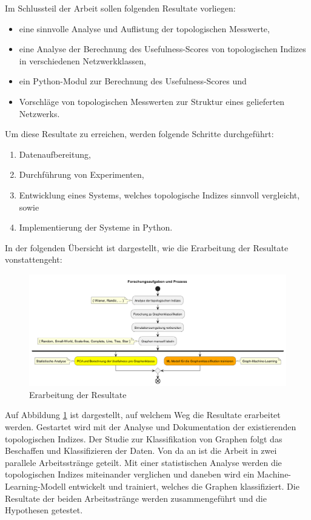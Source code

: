 Im Schlussteil der Arbeit sollen folgenden Resultate vorliegen:
\begin{itemize}
    \item eine sinnvolle Analyse und Auflistung der topologischen Messwerte,
    \item eine Analyse der Berechnung des Usefulness-Scores von topologischen Indizes in verschiedenen Netzwerkklassen,
    \item ein Python-Modul zur Berechnung des Usefulness-Scores und
    \item Vorschläge von topologischen Messwerten zur Struktur eines gelieferten Netzwerks.
\end{itemize}

Um diese Resultate zu erreichen, werden folgende Schritte durchgeführt:
\begin{enumerate}
    \item Datenaufbereitung,
    \item Durchführung von Experimenten,
    \item Entwicklung eines Systems, welches topologische Indizes sinnvoll vergleicht, sowie
    \item Implementierung der Systeme in Python.
\end{enumerate}

In der folgenden Übersicht ist dargestellt, wie die Erarbeitung der Resultate vonstattengeht:

\begin{figure}[H]
    \centering
    \includegraphics[width=1\textwidth]{images/30_results/activity_research.png}
    \caption{Erarbeitung der Resultate}
    \label{fig:results}
\end{figure}

Auf Abbildung \ref{fig:results} ist dargestellt, auf welchem Weg die Resultate erarbeitet werden. 
Gestartet wird mit der Analyse und Dokumentation der existierenden topologischen Indizes.
Der Studie zur Klassifikation von Graphen folgt das Beschaffen und Klassifizieren der Daten. 
Von da an ist die Arbeit in zwei parallele Arbeitsstränge geteilt. 
Mit einer statistischen Analyse werden die topologischen Indizes miteinander verglichen und daneben wird ein Machine-Learning-Modell entwickelt und trainiert, welches die Graphen klassifiziert. 
Die Resultate der beiden Arbeitsstränge werden zusammengeführt und die Hypothesen getestet.

